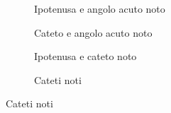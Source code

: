 \begin{figure}
	\begin{subfigure}[b]{.5\linewidth}
		\centering

	\caption{Ipotenusa e angolo acuto noto}
	\label{fig:risTriangRett_1}
	\end{subfigure}%
	\begin{subfigure}[b]{.5\linewidth}
		\centering
		
		\caption{Cateto e angolo acuto noto}
		\label{fig:risTriangRett_2}
	\end{subfigure}
	\begin{subfigure}[b]{.5\linewidth}
		\centering
	
	\caption{Ipotenusa e cateto noto}
	\label{fig:risTriangRett_3}
	\end{subfigure}%
	\begin{subfigure}[b]{.5\linewidth}
		\centering
		
		\caption{Cateti noti}
		\label{fig:risTriangRett_4}
	\end{subfigure}
	\label{fig:RisoluzioneTriangoliRettangoli}
\end{figure}
